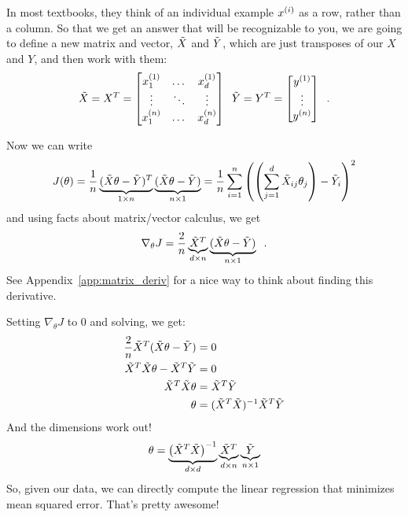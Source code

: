 In most textbooks, they think of an individual example $x^{(i)}$ as
a row, rather than a column.  So that we get an answer that will be
recognizable to you, we are going to define a new matrix and vector,
$\tilde{X}$ and $\tilde{Y}$, which are just transposes of our $X$ and $Y$, and
then work with them:
$$ \tilde{X} = X^T = \begin{bmatrix}x_1^{(1)} & \dots & x_d^{(1)}\\\vdots & \ddots & \vdots\\x_1^{(n)} & \dots & x_d^{(n)}\end{bmatrix} \;\;
  \tilde{Y} = Y^T = \begin{bmatrix}y^{(1)}\\\vdots\\y^{(n)}\end{bmatrix} \;\;.$$

Now we can write
\[ J(\theta) = \frac{1}{n}\underbrace{(\tilde{X}\theta - \tilde{Y})^T}_{1 \times
    n}\underbrace{(\tilde{X}\theta - \tilde{Y})}_{n \times 1} =
  \frac{1}{n}\sum_{i=1}^n \left(\left(\sum_{j=1}^d \tilde{X}_{ij}\theta_j
    \right) - \tilde{Y}_i\right)^2\]
and using facts about matrix/vector calculus, we get 
\begin{equation}
  \nabla_{\theta}J = \frac{2}{n}\underbrace{\tilde{X}^T}_{d \times n}\underbrace{(\tilde{X}\theta - \tilde{Y})}_{n \times 1}\;\;.
\end{equation}
See Appendix~\ref{app:matrix_deriv} for a nice way to think about finding this
derivative.

Setting $ \nabla_{\theta}J$ to 0 and solving, we get:
\begin{align*}
  \frac{2}{n}\tilde{X}^T(\tilde{X}\theta - \tilde{Y}) & = 0                          \\
  \tilde{X}^T\tilde{X}\theta - \tilde{X}^T \tilde{Y}        & = 0                          \\
  \tilde{X}^T\tilde{X}\theta                    & =  \tilde{X}^T \tilde{Y}                 \\
  \theta                            & =  (\tilde{X}^T\tilde{X})^{-1} \tilde{X}^T \tilde{Y} \\
\end{align*}
And the dimensions work out!
$$ \theta = \underbrace{\left(\tilde{X}^T\tilde{X}\right)^{-1}}_{d \times d}\underbrace{\tilde{X}^T}_{d \times n}\underbrace{\tilde{Y}}_{n \times 1} $$
So, given our data, we can directly compute the linear regression that
minimizes mean squared error.  That's pretty awesome!

